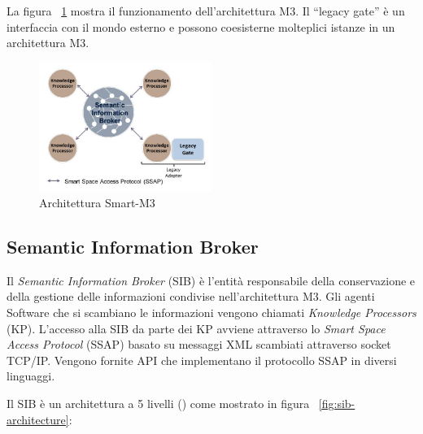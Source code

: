 La figura ~\ref{fig:smart-m3} mostra il funzionamento dell'architettura M3. Il ``legacy gate'' è un interfaccia con il mondo esterno e possono coesisterne molteplici istanze in un architettura M3.

\begin{figure}[H]
	\centering
	\includegraphics[width=0.5\textwidth]{assets/smart-m3.jpg}
	\caption{Architettura Smart-M3}
	\label{fig:smart-m3}
\end{figure}

\subsection{Semantic Information Broker}\label{subsec:sib}

Il \emph{Semantic Information Broker} (SIB) è l'entità responsabile della conservazione e della gestione delle informazioni condivise nell'architettura M3. Gli agenti Software che si scambiano le informazioni vengono chiamati \emph{Knowledge Processors} (KP). L'accesso alla SIB da parte dei KP avviene attraverso lo \emph{Smart Space Access Protocol}  (SSAP) basato su messaggi XML scambiati attraverso socket TCP/IP. Vengono fornite API che implementano il protocollo SSAP in diversi linguaggi.

Il SIB è un architettura a 5 livelli (\cite{smart2010}) come mostrato in figura ~\ref{fig:sib-architecture}:

